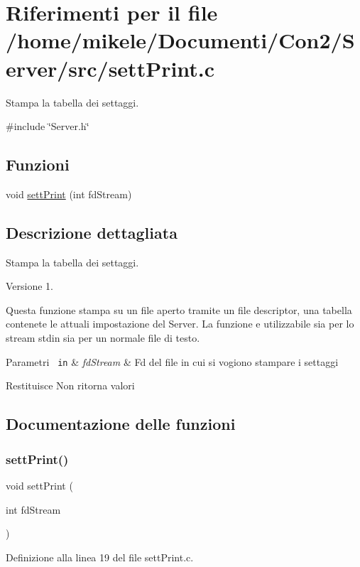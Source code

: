\hypertarget{a00053}{}\section{Riferimenti per il file /home/mikele/\+Documenti/\+Con2/\+Server/src/sett\+Print.c}
\label{a00053}


Stampa la tabella dei settaggi.  


{\ttfamily \#include \char`\"{}Server.\+h\char`\"{}}\newline
\subsection*{Funzioni}
\begin{DoxyCompactItemize}
\item 
void \mbox{\hyperlink{a00053_a97f7da246f13aa6b171eba5834af3e94}{sett\+Print}} (int fd\+Stream)
\end{DoxyCompactItemize}


\subsection{Descrizione dettagliata}
Stampa la tabella dei settaggi. 

\begin{DoxyVersion}{Versione}
1.
\end{DoxyVersion}
Questa funzione stampa su un file aperto tramite un file descriptor, una tabella contenete le attuali impostazione del Server. La funzione e\textquotesingle{} utilizzabile sia per lo stream stdin sia per un normale file di testo.


\begin{DoxyParams}[1]{Parametri}
\mbox{\texttt{ in}}  & {\em fd\+Stream} & Fd del file in cui si vogiono stampare i settaggi\\
\hline
\end{DoxyParams}
\begin{DoxyReturn}{Restituisce}
Non ritorna valori 
\end{DoxyReturn}


\subsection{Documentazione delle funzioni}
\mbox{\label{a00053_a97f7da246f13aa6b171eba5834af3e94}} 
\subsubsection{\texorpdfstring{settPrint()}{settPrint()}}
{\footnotesize\ttfamily void sett\+Print (\begin{DoxyParamCaption}\item[{int}]{fd\+Stream }\end{DoxyParamCaption})}



Definizione alla linea 19 del file sett\+Print.\+c.


